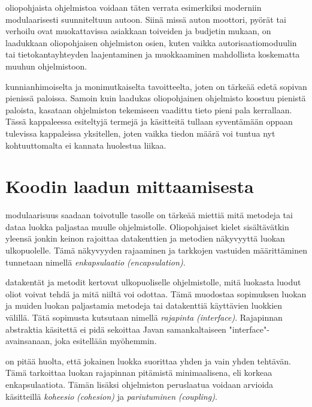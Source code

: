 \documentclass{tufte-book}
\newcommand{\eng}[1]{\textit{(#1)}}
\newcommand{\new}[1]{\textit{\gls{#1}}}
\newcommand{\neweng}[2]{\new{#1} \eng{#2}}
\begin{document}
 oliopohjaista ohjelmistoa voidaan täten verrata esimerkiksi
moderniin modulaarisesti suunniteltuun autoon. Siinä missä auton moottori, pyörät tai verhoilu
ovat muokattavissa asiakkaan toiveiden ja budjetin mukaan, on laadukkaan oliopohjaisen ohjelmiston
osien, kuten vaikka autorisaatiomoduulin tai tietokantayhteyden laajentaminen ja muokkaaminen
mahdollista koskematta muuhun ohjelmistoon.

 kunnianhimoiselta ja monimutkaiselta tavoitteelta, joten on tärkeää
edetä sopivan pienissä paloissa. Samoin kuin laadukas oliopohjainen ohjelmisto koostuu pienistä
paloista, kasataan ohjelmiston tekemiseen vaadittu tieto pieni pala kerrallaan. Tässä kappaleessa
esiteltyjä termejä ja käsitteitä tullaan syventämään oppaan tulevissa kappaleissa yksitellen,
joten vaikka tiedon määrä voi tuntua nyt kohtuuttomalta ei kannata huolestua liikaa.


\section{Koodin laadun mittaamisesta}
\label{koodin laadusta}

 modulaarisuus saadaan toivotulle tasolle on tärkeää miettiä mitä
metodeja tai dataa luokka paljastaa muulle ohjelmistolle. Oliopohjaiset kielet sisältävätkin
yleensä jonkin keinon rajoittaa datakenttien ja metodien näkyvyyttä luokan ulkopuolelle. Tämä
näkyvyyden rajaaminen ja tarkkojen vastuiden määrittäminen tunnetaan nimellä
\neweng{enkapsulaatio}{encapsulation}.

 datakentät ja metodit kertovat ulkopuoliselle ohjelmistolle, mitä
luokasta luodut oliot voivat tehdä ja mitä niiltä voi odottaa. Tämä muodostaa sopimuksen luokan ja
muiden luokan paljastamia metodeja tai datakenttiä käyttävien luokkien välillä. Tätä sopimusta
kutsutaan nimellä \neweng{rajapinta}{interface}. Rajapinnan abstraktia käsitettä ei pidä sekoittaa
Javan samankaltaiseen "interface"-avainsanaan, joka esitellään myöhemmin.

 on pitää huolta, että jokainen luokka
suorittaa yhden ja vain yhden tehtävän. Tämä tarkoittaa luokan rajapinnan pitämistä minimaalisena,
eli korkeaa enkapsulaatiota. Tämän lisäksi ohjelmiston peruslaatua voidaan arvioida käsitteillä
\neweng{koheesio}{cohesion} ja \neweng{pariutuminen}{coupling}.
\end{document}
